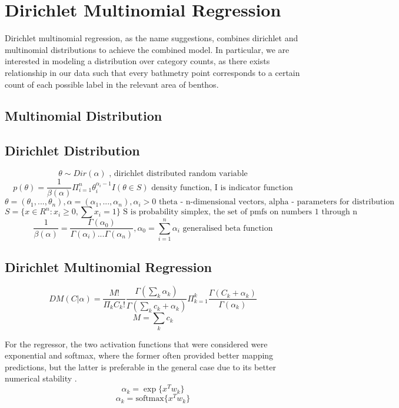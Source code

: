 \chapter{Dirichlet Multinomial Regression} \label{chap:dms}

Dirichlet multinomial regression, as the name suggestions, combines dirichlet and multinomial distributions to achieve the combined model. In particular, we are interested in modeling a distribution over category counts, as there exists relationship in our data such that every bathmetry point corresponds to a certain count of each possible label in the relevant area of benthos. 

\section{Multinomial Distribution}

\section{Dirichlet Distribution}

$$\theta \sim Dir(\alpha) \text{ , dirichlet distributed random variable}$$ 
$$p(\theta)= \frac{1}{\beta(\alpha)} \Pi_{i=1}^n \theta_i^{\alpha_i - 1} I(\theta \in S) \text{ density function, I is indicator function}$$ 
$$ \theta = (\theta_1, ..., \theta_n), \alpha = (\alpha_1,...,\alpha_n), \alpha_i > 0 \text{ theta - n-dimensional vectors, alpha - parameters for distribution}$$
$$ S = \{x \in R^n : x_i \geq 0, \sum x_i = 1\} \text{ S is probability simplex, the set of pmfs on numbers 1 through n}$$ 
$$\frac{1}{\beta(\alpha)} = \frac{\Gamma(\alpha_0)}{\Gamma(\alpha_i) ... \Gamma(\alpha_n)}, \alpha_0 = \sum_{i=1}^n \alpha_i \text{ generalised beta function}$$

\section{Dirichlet Multinomial Regression}


$$DM(C|\alpha) = \frac{M!}{\Pi_k C_k!} \frac{\Gamma(\sum_k \alpha_k)}{\Gamma(\sum_k c_k + \alpha_k)} \Pi_{k=1}^k \frac{\Gamma(C_k + \alpha_k)}{\Gamma(\alpha_k)}$$
$$ M = \sum_k c_k $$

For the regressor, the two activation functions that were considered were exponential and softmax, where the former often provided better mapping predictions, but the latter is preferable in the general case due to its better numerical stability .
$$\alpha_k = \exp\{x^T w_k\}$$
$$\alpha_k = \text{softmax}\{x^T w_k\}$$

